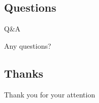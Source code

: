 \documentclass{beamer}
\begin{document}
\subsection{Questions}
\begin{frame}{Q\&A}
	\begin{center}Any questions?\end{center}
\end{frame}

\subsection{Thanks}
\begin{frame}
	\begin{center}Thank you for your attention\end{center}
\end{frame}
\end{document}
